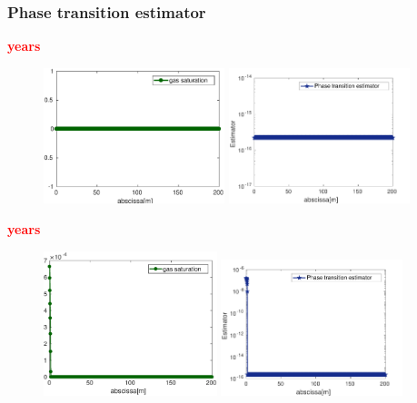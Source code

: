 \begin{frame}
\frametitle{Phase transition estimator}

  \begin{overprint}
     \scriptsize{\textcolor{red}{\textbf{ years}}} 
\begin{figure}
\includegraphics[width=0.47\textwidth]{fig_article_chap_3/satur_gas_init_time2}
\quad
\includegraphics[width=0.47\textwidth]{fig_article_chap_3/MODIF_phase_transition_estimator_appearance_gas_nt=inittime_cv} 
    \end{figure}
\scriptsize{\textcolor{red}{ \textbf{ years}}}
\begin{figure}
\includegraphics[width=0.45\textwidth]{fig_article_chap_3/satur_gas_appearance.eps}
 \quad
\includegraphics[width=0.47\textwidth]{fig_article_chap_3/MODIF_phase_transition_estimator_appearance_gas_nt=2_cv}
\end{figure}    


\end{overprint}
\end{frame}
